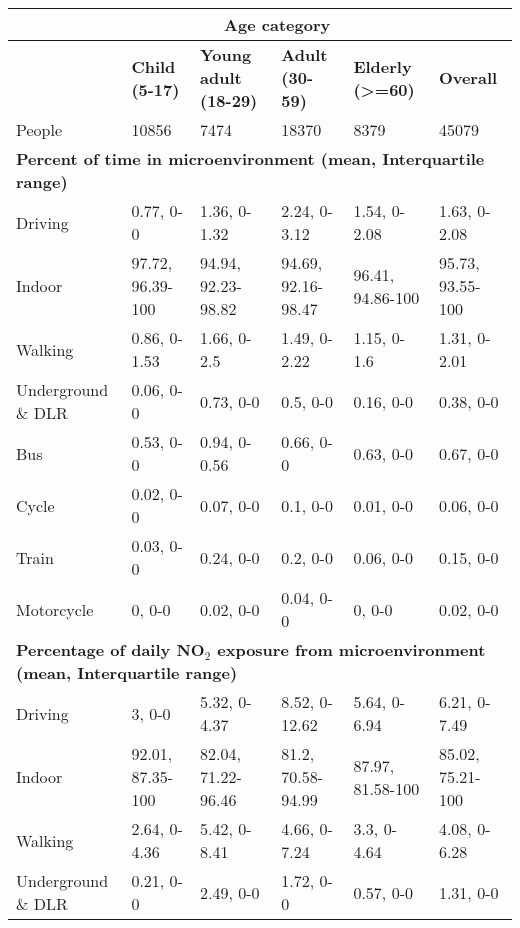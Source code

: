 \thispagestyle{empty}
\begin{landscape}

\begin{table}[H]
\centering
    \begin{tabular}{ | p{3.5cm} | p{3.3cm} | p{3.9cm} | p{3.3cm} | p{3.1cm} | p{3.1cm} |}
    \hline 
     & \multicolumn{4}{|c|}{\bfseries{Age category}} & \\ \hline
     & \bfseries{Child} (5-17) & \bfseries{Young adult} (18-29) & \bfseries{Adult (30-59)} & \bfseries{Elderly (\textgreater=60)} & \bfseries{Overall} \\ \hline
     People & 10856 & 7474 & 18370 & 8379 & 45079 \\ \hline
     \multicolumn{6}{|l|}{\bfseries{Percent of time in microenvironment (mean, Interquartile range)}} \\ \hline
     Driving & 0.77, 0-0 & 1.36, 0-1.32 & 2.24, 0-3.12 & 1.54, 0-2.08 & 1.63, 0-2.08 \\ \hline
     Indoor & 97.72, 96.39-100 & 94.94, 92.23-98.82 & 94.69, 92.16-98.47 & 96.41, 94.86-100 & 95.73, 93.55-100 \\ \hline
     Walking & 0.86, 0-1.53 & 1.66, 0-2.5 & 1.49, 0-2.22 & 1.15, 0-1.6 & 1.31, 0-2.01 \\ \hline
     Underground \& DLR & 0.06, 0-0 & 0.73, 0-0 & 0.5, 0-0 & 0.16, 0-0 & 0.38, 0-0 \\ \hline
     Bus & 0.53, 0-0 & 0.94, 0-0.56 & 0.66, 0-0 & 0.63, 0-0 & 0.67, 0-0 \\ \hline
     Cycle & 0.02, 0-0 & 0.07, 0-0 & 0.1, 0-0 & 0.01, 0-0 & 0.06, 0-0 \\ \hline
     Train & 0.03, 0-0 & 0.24, 0-0 & 0.2, 0-0 & 0.06, 0-0 & 0.15, 0-0 \\ \hline
     Motorcycle & 0, 0-0 & 0.02, 0-0 & 0.04, 0-0 & 0, 0-0 & 0.02, 0-0 \\ \hline
     \multicolumn{6}{|l|}{\bfseries{Percentage of daily NO$_{2}$ exposure from microenvironment (mean, Interquartile range)}} \\ \hline
     Driving & 3, 0-0 & 5.32, 0-4.37 & 8.52, 0-12.62 & 5.64, 0-6.94 & 6.21, 0-7.49 \\ \hline
     Indoor & 92.01, 87.35-100 & 82.04, 71.22-96.46 & 81.2, 70.58-94.99 & 87.97, 81.58-100 & 85.02, 75.21-100 \\ \hline
     Walking & 2.64, 0-4.36 & 5.42, 0-8.41 & 4.66, 0-7.24 & 3.3, 0-4.64 & 4.08, 0-6.28 \\ \hline
     Underground \& DLR & 0.21, 0-0 & 2.49, 0-0 & 1.72, 0-0 & 0.57, 0-0 & 1.31, 0-0 \\ \hline

\end{tabular}
\end{table}
\end{landscape}
